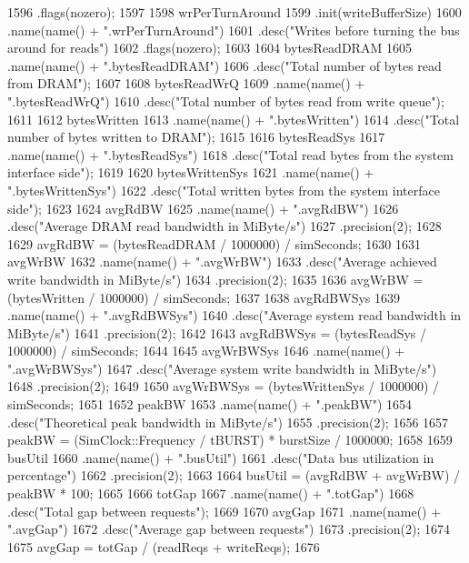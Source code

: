 \begin{DoxyCode}
{1596          .flags(nozero);
1597 
1598      wrPerTurnAround
1599          .init(writeBufferSize)
1600          .name(name() + ".wrPerTurnAround")
1601          .desc("Writes before turning the bus around for reads")
1602          .flags(nozero);
1603 
1604     bytesReadDRAM
1605         .name(name() + ".bytesReadDRAM")
1606         .desc("Total number of bytes read from DRAM");
1607 
1608     bytesReadWrQ
1609         .name(name() + ".bytesReadWrQ")
1610         .desc("Total number of bytes read from write queue");
1611 
1612     bytesWritten
1613         .name(name() + ".bytesWritten")
1614         .desc("Total number of bytes written to DRAM");
1615 
1616     bytesReadSys
1617         .name(name() + ".bytesReadSys")
1618         .desc("Total read bytes from the system interface side");
1619 
1620     bytesWrittenSys
1621         .name(name() + ".bytesWrittenSys")
1622         .desc("Total written bytes from the system interface side");
1623 
1624     avgRdBW
1625         .name(name() + ".avgRdBW")
1626         .desc("Average DRAM read bandwidth in MiByte/s")
1627         .precision(2);
1628 
1629     avgRdBW = (bytesReadDRAM / 1000000) / simSeconds;
1630 
1631     avgWrBW
1632         .name(name() + ".avgWrBW")
1633         .desc("Average achieved write bandwidth in MiByte/s")
1634         .precision(2);
1635 
1636     avgWrBW = (bytesWritten / 1000000) / simSeconds;
1637 
1638     avgRdBWSys
1639         .name(name() + ".avgRdBWSys")
1640         .desc("Average system read bandwidth in MiByte/s")
1641         .precision(2);
1642 
1643     avgRdBWSys = (bytesReadSys / 1000000) / simSeconds;
1644 
1645     avgWrBWSys
1646         .name(name() + ".avgWrBWSys")
1647         .desc("Average system write bandwidth in MiByte/s")
1648         .precision(2);
1649 
1650     avgWrBWSys = (bytesWrittenSys / 1000000) / simSeconds;
1651 
1652     peakBW
1653         .name(name() + ".peakBW")
1654         .desc("Theoretical peak bandwidth in MiByte/s")
1655         .precision(2);
1656 
1657     peakBW = (SimClock::Frequency / tBURST) * burstSize / 1000000;
1658 
1659     busUtil
1660         .name(name() + ".busUtil")
1661         .desc("Data bus utilization in percentage")
1662         .precision(2);
1663 
1664     busUtil = (avgRdBW + avgWrBW) / peakBW * 100;
1665 
1666     totGap
1667         .name(name() + ".totGap")
1668         .desc("Total gap between requests");
1669 
1670     avgGap
1671         .name(name() + ".avgGap")
1672         .desc("Average gap between requests")
1673         .precision(2);
1674 
1675     avgGap = totGap / (readReqs + writeReqs);
1676 
}
\end{DoxyCode}
